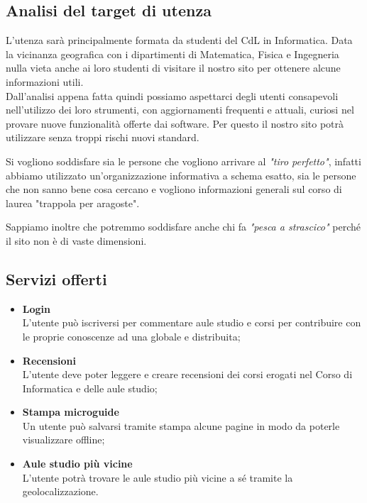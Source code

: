 \subsection{Analisi del target di utenza}

L'utenza sarà principalmente formata da studenti del CdL in Informatica. Data la vicinanza geografica con i dipartimenti di Matematica, Fisica e Ingegneria nulla vieta anche ai loro studenti di visitare il nostro sito per ottenere alcune informazioni utili.\\
Dall'analisi appena fatta quindi possiamo aspettarci degli utenti consapevoli nell'utilizzo dei loro strumenti, con aggiornamenti frequenti e attuali, curiosi nel provare nuove funzionalità offerte dai software. Per questo il nostro sito potrà utilizzare senza troppi rischi nuovi standard.

Si vogliono soddisfare sia le persone che vogliono arrivare al \textit{"tiro perfetto"}, infatti abbiamo utilizzato un'organizzazione informativa a schema esatto, sia le persone che non sanno bene cosa cercano e vogliono informazioni generali sul corso di laurea "trappola per aragoste".

Sappiamo inoltre che potremmo soddisfare anche chi fa \textit{"pesca a strascico"} perché il sito non è di vaste dimensioni.

\subsection{Servizi offerti}
\begin{itemize}
    \item \textbf{Login} \\ L'utente può iscriversi per commentare aule studio e corsi per contribuire con le proprie conoscenze ad una globale e distribuita;
    \item \textbf{Recensioni} \\L'utente deve poter leggere e creare recensioni dei corsi erogati nel Corso di Informatica e delle aule studio;
    \item \textbf{Stampa microguide} \\ Un utente può salvarsi tramite stampa alcune pagine in modo da poterle visualizzare offline;
    \item \textbf{Aule studio più vicine} \\ L'utente potrà trovare le aule studio più vicine a sé tramite la geolocalizzazione.
\end{itemize}